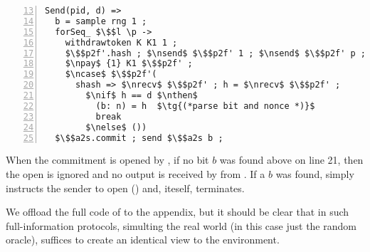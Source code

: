 \begin{lstlisting}[basicstyle=\footnotesize\BeraMonottFamily, mathescape, frame=single, numbers=left, xleftmargin=2em, xrightmargin=2em, firstnumber=13]
Send(pid, d) =>
  b = sample rng 1 ;
  forSeq_ $\$$l \p ->
    withdrawtoken K K1 1 ;
    $\$$p2f'.hash ; $\nsend$ $\$$p2f' 1 ; $\nsend$ $\$$p2f' p ;
    $\npay$ {1} K1 $\$$p2f' ;
    $\ncase$ $\$$p2f'( 
      shash => $\nrecv$ $\$$p2f' ; h = $\nrecv$ $\$$p2f' ;
        $\nif$ h == d $\nthen$
          (b: n) = h  $\tg{(*parse bit and nonce *)}$
          break
        $\nelse$ ())
  $\$$a2s.commit ; send $\$$a2s b ;
\end{lstlisting}
When the commitment is opened by \Z, if no bit $b$ was found above on line 21, then the open is ignored and no output is received by \Z from \Fcom.
If a $b$ was found, \simcom simply instructs the sender to open () and, iteself, terminates.  

We offload the full code of \simcom to the appendix, but it should be clear that in such full-information protocols, simulting the real world (in this case just the random oracle), suffices to create an identical view to the environment.





